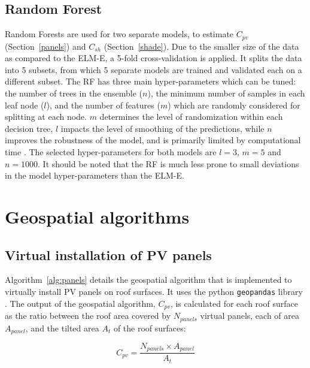 \subsection*{Random Forest}
\label{app:tune_RF}

Random Forests are used for two separate models, to estimate $C_{pv}$ (Section~\ref{panels}) and $C_{sh}$ (Section~\ref{shade}). Due to the smaller size of the data as compared to the ELM-E, a 5-fold cross-validation is applied. It splits the data into 5 subsets, from which 5 separate models are trained and validated each on a different subset. 
The RF has three main hyper-parameters which can be tuned: the number of trees in the ensemble ($n$), the minimum number of samples in each leaf node ($l$), and the number of features ($m$) which are randomly considered for splitting at each node. $m$ determines the level of randomization within each decision tree, $l$ impacts the level of smoothing of the predictions, while $n$ improves the robustness of the model, and is primarily limited by computational time \cite{breiman_random_2001}.
The selected hyper-parameters for both models are  $l = 3$, $m = 5$ and $n = 1000$. It should be noted that the RF is much less prone to small deviations in the model hyper-parameters than the ELM-E.


\section{Geospatial algorithms}

\subsection*{Virtual installation of PV panels}
\label{app:virtualPV}

Algorithm~\ref{alg:panels} details the geospatial algorithm that is implemented to virtually install PV panels on roof surfaces. It uses the python \texttt{geopandas} library \cite{kelsey_jordahl_geopandas/geopandas:_2019}. 
The output of the geospatial algorithm, $C_{pv}$, is calculated for each roof surface as the ratio between the roof area covered by $N_{panels}$ virtual panels, each of area $A_{panel}$, and the tilted area $A_{t}$ of the roof surfaces: 

\begin{equation}
\label{eq:cpv}
C_{pv} = \frac{N_{panels} \times A_{panel}}{A_t}
\end{equation}

